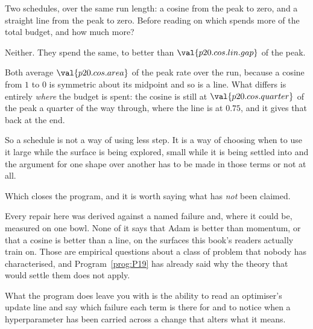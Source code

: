 \begin{fr}
Two schedules, over the same run length: a cosine from the peak to zero, and a
straight line from the peak to zero. Before reading on \dash{} which spends
more of the total budget, and how much more?
\nextframe
\end{fr}

\begin{fr}
\begin{ansblock}
Neither. They spend the same, to better than $\val{p20.cos.lin.gap}$ of the
peak.
\end{ansblock}

Both average $\val{p20.cos.area}$ of the peak rate over the run, because a
cosine from $1$ to $0$ is symmetric about its midpoint and so is a line. What
differs is entirely \emph{where} the budget is spent: the cosine is still at
$\val{p20.cos.quarter}$ of the peak a quarter of the way through, where the
line is at $\num{0.75}$, and it gives that back at the end.

So a schedule is not a way of using less step. It is a way of choosing when to
use it \dash{} large while the surface is being explored, small while it is
being settled into \dash{} and the argument for one shape over another has to
be made in those terms or not at all.
\end{fr}

\begin{fr}
Which closes the program, and it is worth saying what has \emph{not} been
claimed.

Every repair here was derived against a named failure and, where it could be,
measured on one bowl. None of it says that Adam is better than momentum, or
that a cosine is better than a line, on the surfaces this book's readers
actually train on. Those are empirical questions about a class of problem that
nobody has characterised, and Program~\ref{prog:P19} has already said why the
theory that would settle them does not apply.

What the program does leave you with is the ability to read an optimiser's
update line and say which failure each term is there for \dash{} and to notice
when a hyperparameter has been carried across a change that alters what it
means.
\end{fr}

